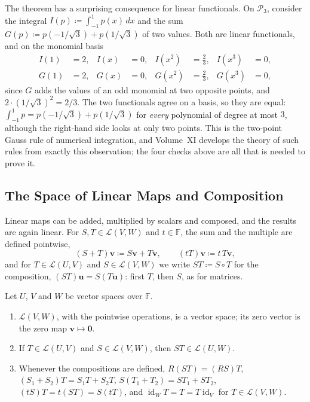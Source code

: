 The theorem has a surprising consequence for linear functionals. On $\mathcal P_3$, consider the integral $I(p)\coloneqq\int_{-1}^1p(x)\,dx$ and the sum $G(p)\coloneqq p(-1/\sqrt3)+p(1/\sqrt3)$ of two values. Both are linear functionals, and on the monomial basis
\[
\begin{aligned}
I(1)&=2,&I(x)&=0,&I(x^2)&=\tfrac23,&I(x^3)&=0,\\
G(1)&=2,&G(x)&=0,&G(x^2)&=\tfrac23,&G(x^3)&=0,
\end{aligned}
\]
since $G$ adds the values of an odd monomial at two opposite points, and $2\cdot(1/\sqrt3)^2=2/3$. The two functionals agree on a basis, so they are equal: $\int_{-1}^1p=p(-1/\sqrt3)+p(1/\sqrt3)$ for \emph{every} polynomial of degree at most $3$, although the right-hand side looks at only two points. This is the two-point Gauss rule of numerical integration, and Volume~XI develops the theory of such rules from exactly this observation; the four checks above are all that is needed to prove it.

\subsection{The Space of Linear Maps and Composition}

Linear maps can be added, multiplied by scalars and composed, and the results are again linear. For $S,T\in\mathcal L(V,W)$ and $t\in\mathbb F$, the sum and the multiple are defined pointwise,
\[
(S+T)\mathbf v\coloneqq S\mathbf v+T\mathbf v,\qquad(tT)\mathbf v\coloneqq t\,T\mathbf v,
\]
and for $T\in\mathcal L(U,V)$ and $S\in\mathcal L(V,W)$ we write $ST\coloneqq S\circ T$ for the composition, $(ST)\mathbf u=S(T\mathbf u)$: first $T$, then $S$, as for matrices.

\begin{proposition}
\label{prop:linear-map-space}
Let $U$, $V$ and $W$ be vector spaces over $\mathbb F$.
\begin{enumerate}
\item $\mathcal L(V,W)$, with the pointwise operations, is a vector space; its zero vector is the zero map $\mathbf v\mapsto\mathbf 0$.
\item If $T\in\mathcal L(U,V)$ and $S\in\mathcal L(V,W)$, then $ST\in\mathcal L(U,W)$.
\item Whenever the compositions are defined, $R(ST)=(RS)T$, $(S_1+S_2)T=S_1T+S_2T$, $S(T_1+T_2)=ST_1+ST_2$, $(tS)T=t(ST)=S(tT)$, and $\operatorname{id}_WT=T=T\operatorname{id}_V$ for $T\in\mathcal L(V,W)$.
\end{enumerate}
\end{proposition}

